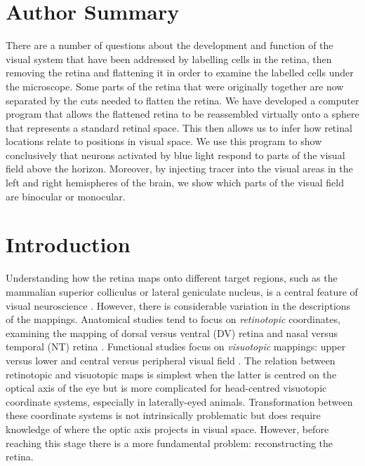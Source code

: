 \documentclass[10pt]{article}
\begin{document}
\section*{Author Summary}
There are a number of questions about the development and function of
the visual system that have been addressed by labelling cells in the
retina, then removing the retina and flattening it in order to
examine the labelled cells under the microscope. Some parts of the
retina that were originally together are now separated by the cuts
needed to flatten the retina. We have developed a computer program
that allows the flattened retina to be reassembled virtually onto a
sphere that represents a standard retinal space. This then allows us
to infer how retinal locations relate to positions in visual space.
We use this program to show conclusively that neurons activated by
blue light respond to parts of the visual field above the horizon.
Moreover, by injecting tracer into the visual areas in the left and
right hemispheres of the brain, we show which parts of the visual
field are binocular or monocular.

\section*{Introduction}
Understanding  how the retina maps onto different target regions, such
as the mammalian superior colliculus or lateral geniculate nucleus,
is a central feature of visual neuroscience \cite{DragerHubel1976,ColemanEtal2009}. However, there is considerable variation in the
descriptions of the mappings. Anatomical studies tend to focus on
\textit{retinotopic} coordinates, examining the mapping of dorsal
versus ventral (DV) retina and nasal versus temporal (NT) retina \cite{ReberEtal2004,RashidEtal2005}. Functional studies focus on
\textit{visuotopic} mappings: upper versus lower and central versus
peripheral visual field \cite{DragerHubel1976,DragerOlsen1980,HausteadEtal2008}.  The relation between retinotopic and
visuotopic maps is simplest when the latter is centred on the optical
axis of the eye but is more complicated for head-centred visuotopic
coordinate systems, especially in laterally-eyed animals.
Transformation between these coordinate systems is not intrinsically
problematic but does require knowledge of where the optic axis
projects in visual space. However, before reaching this stage there
is a more fundamental problem: reconstructing the retina.
\end{document}

